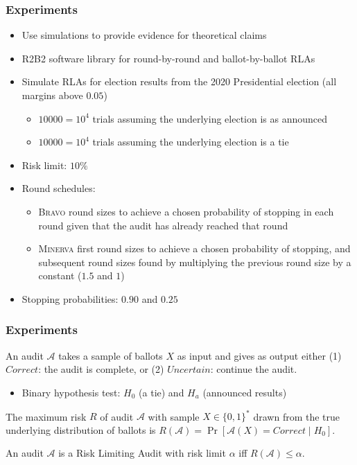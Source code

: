 \documentclass{beamer}
\newcommand{\Minerva}{\textsc{Minerva}\xspace}
\newcommand{\BRAVO}{\textsc{Bravo}\xspace}
\begin{document}
\begin{frame}
\frametitle{Experiments}
\begin{itemize}
\item Use simulations to provide evidence for theoretical claims
\item R2B2 software library for round-by-round and ballot-by-ballot RLAs
\item Simulate RLAs for election results from the 2020 Presidential election (all margins above $0.05$)
\begin{itemize}
\item $10000=10^4$ trials assuming the underlying election is as announced
\item $10000=10^4$ trials assuming the underlying election is a tie
\end{itemize}
\item Risk limit: $10\%$
\item Round schedules:
\begin{itemize}
\item \BRAVO round sizes to achieve a chosen probability of stopping in each round given that the audit has already reached that round
\item \Minerva first round sizes to achieve a chosen probability of stopping, and subsequent round sizes found by multiplying the previous round size by a constant ($1.5$ and $1$)
\end{itemize}
\item Stopping probabilities: $0.90$ and $0.25$
\end{itemize}
\end{frame}

\begin{frame}
\frametitle{Experiments}
\begin{definition}
An audit $\mathcal{A}$ takes a sample of ballots $X$ as input and gives as output either
(1) $Correct$: the audit is complete, or (2) $Uncertain$: continue the audit.
\end{definition}

\begin{itemize}
\item Binary hypothesis test: $H_0$ (a tie) and $H_a$ (announced results)
\end{itemize}

\begin{definition}[Risk]
The maximum risk $R$ of audit $\mathcal{A}$ with sample $X\in \{0,1\}^*$ drawn from 
the true underlying distribution of ballots is
$R(\mathcal{A})=\Pr[\mathcal{A}(X)=Correct \mid H_0].$
\end{definition}

\begin{definition}
An audit $\mathcal{A}$ is a Risk Limiting Audit with 
risk limit $\alpha$ iff 
$R(\mathcal{A}) \le \alpha.$
\end{definition}
\end{frame}
\end{document}

